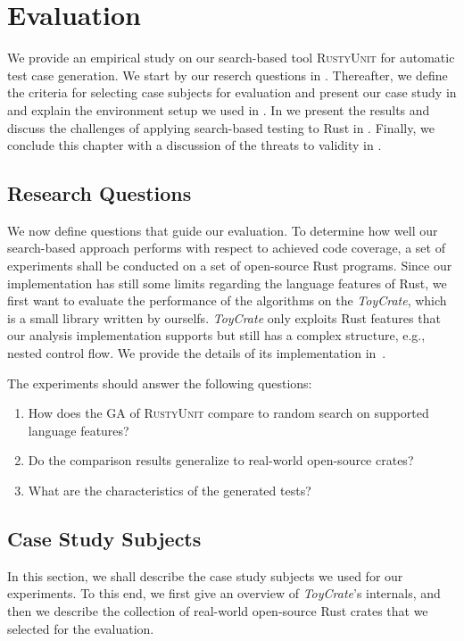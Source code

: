 \documentclass[paper=a4,%
  twoside,%
  BCOR4mm,%
  abstract=true,%
  toc=bibliography,%
  chapterprefix=true,%
  toc=bibliographynumbered,%
  open=right,%
  english,%
  pagesize=pdftex]{scrreprt}
\newcommand{\tech}{\textsc{RustyUnit}\xspace}
\newcommand{\ga}{\ac{GA}\xspace}
\newcommand{\toycrate}{\emph{ToyCrate}\xspace}
\begin{document}
\clearpage
\chapter{Evaluation}
\label{chap:evaluation}

We provide an empirical study on our search-based tool \tech for automatic test case generation. We start by our reserch questions in . Thereafter, we define the criteria for selecting case subjects for evaluation and present our case study in  and explain the environment setup we used in . In  we present the results and discuss the challenges of applying search-based testing to Rust in . Finally, we conclude this chapter with a discussion of the threats to validity in .


\section{Research Questions}
\label{sec:research-questions}
We now define questions that guide our evaluation. To determine how well our search-based approach performs with respect to achieved code coverage, a set of experiments shall be conducted on a set of open-source Rust programs. Since our implementation has still some limits regarding the language features of Rust, we first want to evaluate the performance of the algorithms on the \toycrate, which is a small library written by ourselfs. \toycrate only exploits Rust features that our analysis implementation supports but still has a complex structure, e.g., nested control flow. We provide the details of its implementation in~.

The experiments should answer the following questions:

\begin{enumerate}[start=1, label={\bfseries RQ\arabic*:}]
    \item How does the \ga of \tech compare to random search on supported language features?
    \item Do the comparison results generalize to real-world open-source crates?
    \item What are the characteristics of the generated tests?
\end{enumerate}

\section{Case Study Subjects}
\label{sec:case-study-subjects}
In this section, we shall describe the case study subjects we used for our experiments. To this end, we first give an overview of \toycrate's internals, and then we describe the collection of real-world open-source Rust crates that we selected for the evaluation.
\end{document}
